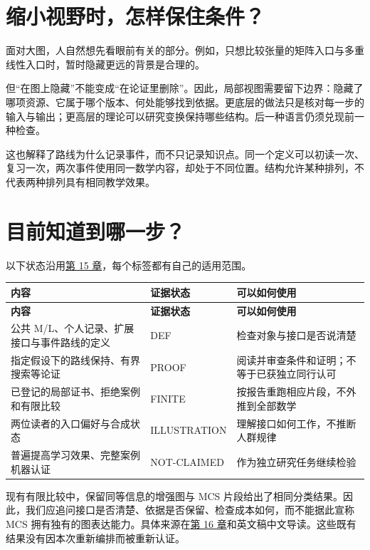 \documentclass[UTF8,a4paper,zihao=-4,fontset=windows,openany]{ctexbook}
\begin{document}
\section{缩小视野时，怎样保住条件？}
面对大图，人自然想先看眼前有关的部分。例如，只想比较张量的矩阵入口与多重线性入口时，暂时隐藏更远的背景是合理的。

但“在图上隐藏”不能变成“在论证里删除”。因此，局部视图需要留下边界：隐藏了哪项资源、它属于哪个版本、何处能够找到依据。更底层的做法只是核对每一步的输入与输出；更高层的理论可以研究变换保持哪些结构。后一种语言仍须兑现前一种检查。

这也解释了路线为什么记录事件，而不只记录知识点。同一个定义可以初读一次、复习一次，两次事件使用同一数学内容，却处于不同位置。结构允许某种排列，不代表两种排列具有相同教学效果。

\section{目前知道到哪一步？}
以下状态沿用\hyperref[mcs-source-21]{第 15 章}，每个标签都有自己的适用范围。

\begingroup\small\setlength{\tabcolsep}{4pt}
\begin{longtable}{>{\raggedright\arraybackslash}p{}>{\raggedright\arraybackslash}p{}>{\raggedright\arraybackslash}p{}}
\toprule
\textbf{内容} & \textbf{证据状态} & \textbf{可以如何使用} \\
\midrule
\endfirsthead
\toprule
\textbf{内容} & \textbf{证据状态} & \textbf{可以如何使用} \\
\midrule
\endhead
\bottomrule
\endfoot
\bottomrule
\endlastfoot
公共 M/L、个人记录、扩展接口与事件路线的定义 & DEF & 检查对象与接口是否说清楚 \\
指定假设下的路线保持、有界搜索等论证 & PROOF & 阅读并审查条件和证明；不等于已获独立同行认可 \\
已登记的局部证书、拒绝案例和有限比较 & FINITE & 按报告重跑相应片段，不外推到全部数学 \\
两位读者的入口偏好与合成状态 & ILLUSTRATION & 理解接口如何工作，不推断人群规律 \\
普遍提高学习效果、完整案例机器认证 & NOT-CLAIMED & 作为独立研究任务继续检验 \\
\end{longtable}
\endgroup

现有有限比较中，保留同等信息的增强图与 MCS 片段给出了相同分类结果。因此，我们应追问接口是否清楚、依据是否保留、检查成本如何，而不能据此宣称 MCS 拥有独有的图表达能力。具体来源在\hyperref[mcs-source-22]{第 16 章}和英文稿中文导读。这些既有结果没有因本次重新编排而被重新认证。
\end{document}
